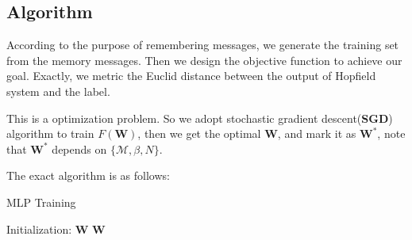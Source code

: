 \subsection{Algorithm}

 According to the purpose of remembering messages, we generate the training set from the memory messages. 
 Then we design the objective function to achieve our goal. 
 Exactly, we metric the Euclid distance between the output of Hopfield system and the label.
 
 This is a optimization problem. So we adopt stochastic gradient descent(\textbf{SGD}) algorithm to train $F(\textbf{W})$, then we get the optimal $\textbf{W}$, and mark it as $\textbf{W}^*$, note that $\textbf{W}^*$ depends on $\{ \mathcal{M}, \beta, N\}$.

 The exact algorithm is as follows:

\begin{algorithm}[tbp]
\LinesNumbered
\caption{MLP Training}\label{MLP Training}
Initialization:
$\textbf{W}$\;
\Return  $\textbf{W}$\;
\end{algorithm} 